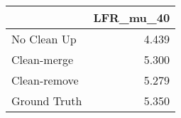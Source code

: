\begin{tabular}{lr}
\toprule
{} & LFR_mu_40 \\
\midrule
No Clean Up  &     4.439 \\
Clean-merge  &     5.300 \\
Clean-remove &     5.279 \\
Ground Truth &     5.350 \\
\bottomrule
\end{tabular}
